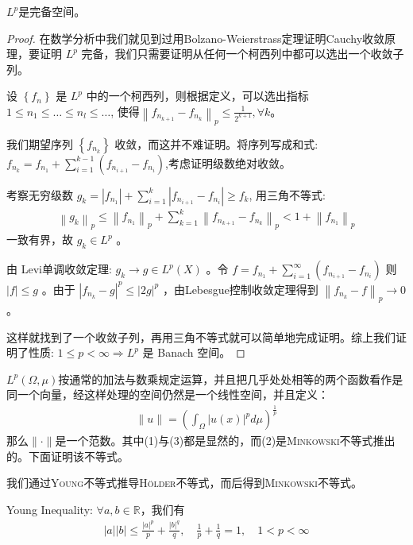 \begin{proposition}
    $L^p$是完备空间。
\end{proposition}

\begin{proof}
    在数学分析中我们就见到过用Bolzano-Weierstrass定理证明Cauchy收敛原理，要证明 $L^p$ 完备，我们只需要证明从任何一个柯西列中都可以选出一个收敛子列。

    设 $\left\{f_n\right\}$ 是 $L^p$ 中的一个柯西列，则根据定义，可以选出指标 $1 \leq n_1 \leq \ldots \leq n_l \leq \ldots$, 使得$\left\|f_{n_{k+1}}-f_{n_k}\right\|_p \leq \frac{1}{2^{k+1}}, \forall k$。

    我们期望序列 $\left\{f_{n_k}\right\}$ 收敛，而这并不难证明。将序列写成和式:$f_{n_k}=f_{n_1}+\sum\limits_{i=1}^{k-1}\left(f_{n_{i+1}}-f_{n_i}\right)$,考虑证明级数绝对收敛。
    
    考察无穷级数 $g_k=\left|f_{n_1}\right|+\sum_{i=1}^k\left|f_{n_{i+1}}-f_{n_i}\right| \geq f_k$, 用三角不等式:
    \begin{align*}
        \left\|g_k\right\|_p \leq\left\|f_{n_1}\right\|_p+\sum_{k=1}^k\left\|f_{n_{k+1}}-f_{n_k}\right\|_p<1+\left\|f_{n_1}\right\|_{p}
    \end{align*}
一致有界，故 $g_k \in L^p$ 。
    
    由 Levi单调收敛定理: $g_k \rightarrow g \in L^p(X)$ 。令 $f=f_{n_1}+\sum_{i=1}^{\infty}\left(f_{n_{i+1}}-f_{n_i}\right)$ 则 $|f| \leq g$ 。由于 $\left|f_{n_k}-g\right|^p \leq|2 g|^p$ ，由Lebesgue控制收敛定理得到 $\left\|f_{n_k}-f\right\|_p \rightarrow 0$。

    这样就找到了一个收敛子列，再用三角不等式就可以简单地完成证明。综上我们证明了性质: $1 \leq p<\infty \Rightarrow L^p$ 是 Banach 空间。
\end{proof}

\begin{remark}
    $L^p(\Omega, \mu)$按通常的加法与数乘规定运算，并且把几乎处处相等的两个函数看作是同一个向量，经这样处理的空间仍然是一个线性空间，并且定义：
    \begin{align}
        \|u\| = \left( \int_{\Omega} |u(x)|^p d\mu\right)^{\frac{1}{p}} \nonumber
    \end{align}
    那么$\|\cdot\|$是一个范数。其中(1)与(3)都是显然的，而(2)是\textsc{Minkowski}不等式推出的。下面证明该不等式。
\end{remark}

我们通过\textsc{Young}不等式推导\textsc{Hölder}不等式，而后得到\textsc{Minkowski}不等式。

\begin{theorem}
    Young Inequality: $\forall a, b\in\mathbb{R}$，我们有
    \begin{align*}
        |a||b| \le \frac{|a|^p}{p} + \frac{|b|^q}{q}, \quad \frac{1}{p} + \frac{1}{q} = 1, \quad 1<p<\infty
    \end{align*}
\end{theorem}

